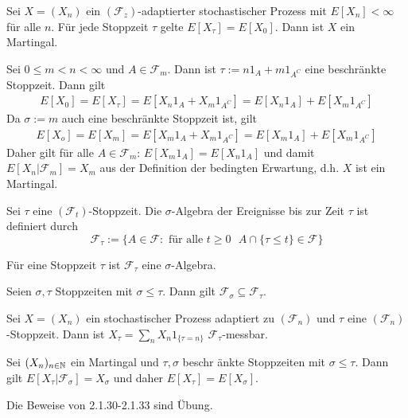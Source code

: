\documentclass[a4paper,twoside,DIV15,BCOR12mm]{scrbook}
\newcommand{\cF}{\mathcal F}
\begin{document}
\begin{satz}
Sei $X=(X_n)$ ein $(\cF_z)$-adaptierter stochastischer Prozess mit $E[X_n]<\infty$ für alle $n$. Für jede Stoppzeit $\tau$ gelte $E[X_\tau]=E[X_0]$. Dann ist $X$ ein Martingal.
\end{satz}

\begin{beweis}
Sei $0\leq m<n<\infty$ und $A\in \cF_m$. Dann ist $\tau:=n 1_A+m 1_{A^C}$ eine beschränkte Stoppzeit. Dann gilt
\begin{align*}
E[X_0]=E[X_\tau]=E[X_n 1_A+X_m 1_{A^C}]=E[X_n1_A]+E[X_m1_{A^C}]
\end{align*}
Da $\sigma:=m$ auch eine beschränkte Stoppzeit ist, gilt
\begin{align*}
E[X_o]=E[X_m]=E[X_m 1_A+X_m 1_{A^C}]=E[X_m1_A]+E[X_m1_{A^C}]
\end{align*}
Daher gilt für alle $A\in \cF_m$: $E[X_m1_A]=E[X_n1_A]$ und damit $E[X_n|\cF_m]=X_m$ aus der Definition der bedingten Erwartung, d.h. $X$ ist ein Martingal. 
\end{beweis}

\begin{definition}
Sei $\tau$ eine $(\cF_t)$-Stoppzeit. Die $\sigma$-Algebra der Ereignisse bis zur Zeit $\tau$ ist definiert durch 
\[
\cF_\tau:=\{A\in \cF: \mbox{ für alle } t\geq0 \mbox{ } A\cap\{\tau\leq t\}\in \cF\}
\]

\end{definition}

\begin{lemma}
Für eine Stoppzeit $\tau$ ist $\cF_\tau$ eine $\sigma$-Algebra.
\end{lemma}

\begin{lemma}
Seien $\sigma,\tau$ Stoppzeiten mit $\sigma \leq \tau$. Dann gilt $\cF_\sigma\subseteq\cF_\tau$.
\end{lemma}

\begin{lemma}
Sei $X=(X_n)$ ein stochastischer Prozess adaptiert zu $(\cF_n)$ und $\tau$ eine $(\cF_n)$-Stoppzeit. Dann ist $X_\tau=\sum\limits_nX_n1_{\{\tau=n\}}$ $\cF_\tau$-messbar.
\end{lemma}

\begin{satz}
Sei $(X_n)_{n\in\mathbb{N}}$ ein Martingal und $\tau,\sigma$ beschr änkte Stoppzeiten mit $\sigma\leq\tau$. Dann gilt $E[X_\tau|\cF_\sigma]=X_\sigma$ und daher $E[X_\tau]=E[X_\sigma]$.
\end{satz}
\begin{beweis}
Die Beweise von 2.1.30-2.1.33 sind \"Ubung.
\end{beweis}
\end{document}
